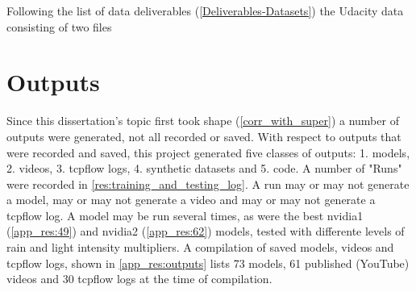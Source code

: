 Following the list of data deliverables (\ref{Deliverables-Datasets}) the Udacity data consisting of two files 



\section{Outputs}
Since this dissertation's topic first took shape (\ref{corr_with_super}) a number of outputs were generated, not all recorded or saved. With respect to outputs that were recorded and saved, this project generated five classes of outputs: 1. models, 2. videos, 3. tcpflow logs, 4. synthetic datasets and 5. code. A number of "Runs" were recorded in \ref{res:training_and_testing_log}. A run may or may not generate a model, may or may not generate a video and may or may not generate a tcpflow log. A model may be run several times, as were the best nvidia1 (\ref{app_res:49}) and nvidia2 (\ref{app_res:62}) models, tested with differente levels of rain and light intensity multipliers.
A compilation of saved models, videos and tcpflow logs, shown in \ref{app_res:outputs} lists 73 models, 61 published (YouTube) videos and 30 tcpflow logs at the time of compilation.



